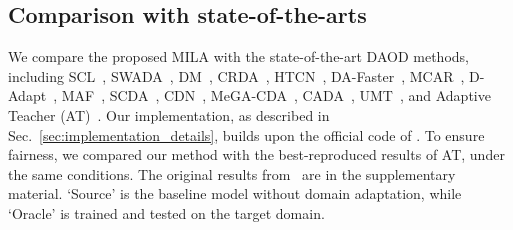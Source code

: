 \documentclass{bmvc2k}
\begin{document}
\subsection{Comparison with state-of-the-arts}
We compare the proposed MILA with the state-of-the-art DAOD methods, including SCL~\cite{shen2019scl}, SWADA~\cite{saito2019strong}, DM~\cite{kim2019diversify}, CRDA~\cite{xu2020exploring}, HTCN~\cite{chen2020harmonizing}, DA-Faster~\cite{chen2018domain}, MCAR~\cite{zhao2020adaptive}, D-Adapt~\cite{jiang2021decoupled},
MAF~\cite{he2019multi}, SCDA~\cite{zhu2019adapting}, CDN~\cite{li2020spatial}, MeGA-CDA~\cite{vs2021mega}, CADA~\cite{hsu2020every}, UMT~\cite{deng2021unbiased}, and Adaptive Teacher (AT)~\cite{li2022cross}.
Our implementation, as described in Sec.~\ref{sec:implementation_details}, builds upon the official code of \cite{li2022cross}. To ensure fairness, we compared our method with the best-reproduced results of AT, under the same conditions. The original results from~\cite{li2022cross} are in the supplementary material. `Source' is the baseline model without domain adaptation, while `Oracle' is trained and tested on the target domain.  
\end{document}
